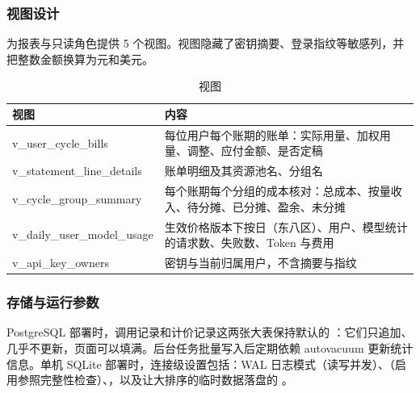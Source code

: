 \subsubsection{视图设计}

为报表与只读角色提供 5 个视图。视图隐藏了密钥摘要、登录指纹等敏感列，并把整数金额换算为元和美元。

\begin{table}[H]
\centering\small
\caption{视图}
\begin{tabularx}{\textwidth}{@{}lX@{}}
\toprule
视图 & 内容 \\ \midrule
v\_user\_cycle\_bills & 每位用户每个账期的账单：实际用量、加权用量、调整、应付金额、是否定稿 \\
v\_statement\_line\_details & 账单明细及其资源池名、分组名 \\
v\_cycle\_group\_summary & 每个账期每个分组的成本核对：总成本、按量收入、待分摊、已分摊、盈余、未分摊 \\
v\_daily\_user\_model\_usage & 生效价格版本下按日（东八区）、用户、模型统计的请求数、失败数、Token 与费用 \\
v\_api\_key\_owners & 密钥与当前归属用户，不含摘要与指纹 \\
\bottomrule
\end{tabularx}
\end{table}

\subsubsection{存储与运行参数}

PostgreSQL 部署时，调用记录和计价记录这两张大表保持默认的 ：它们只追加、几乎不更新，页面可以填满。后台任务批量写入后定期依赖 autovacuum 更新统计信息。单机 SQLite 部署时，连接级设置包括：WAL 日志模式（读写并发）、（启用参照完整性检查）、，以及让大排序的临时数据落盘的 。
